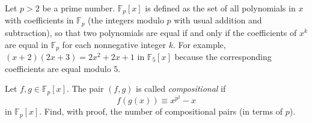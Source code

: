Let $p>2$ be a prime number. $\mathbb{F}_p\left[x\right]$ is defined as the set of all polynomials in $x$ with coefficients in $\mathbb{F}_p$ (the integers modulo $p$ with usual addition and subtraction), so that two polynomials are equal if and only if the coefficients of $x^k$ are equal in $\mathbb{F}_p$ for each nonnegative integer $k$. For example, $\left(x+2\right)\left(2x+3\right)=2x^2+2x+1$ in $\mathbb{F}_5\left[x\right]$ because the corresponding coefficients are equal modulo $5$.

Let $f,g\in\mathbb{F}_p\left[x\right]$. The pair $\left(f,g\right)$ is called \emph{compositional} if \[f\left(g\left(x\right)\right)\equiv x^{p^2}-x\] in $\mathbb{F}_p\left[x\right]$. Find, with proof, the number of compositional pairs (in terms of $p$).